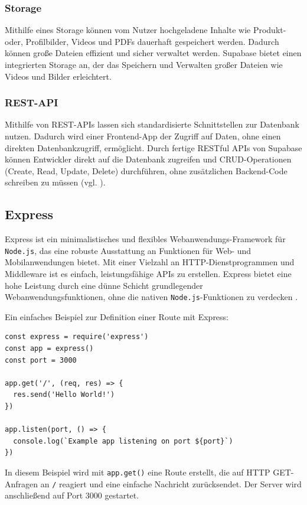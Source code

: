 \documentclass[oneside]{ausarbeitung}
\begin{document}
\subsubsection{Storage}
Mithilfe eines Storage können vom Nutzer hochgeladene Inhalte wie Produkt- oder, Profilbilder, Videos und PDFs dauerhaft gespeichert werden. Dadurch können große Dateien effizient und sicher verwaltet werden. 
Supabase bietet einen integrierten Storage an, der das Speichern und Verwalten großer Dateien wie Videos und Bilder erleichtert. 
\subsubsection{REST-API}
Mithilfe von REST-APIs lassen sich standardisierte Schnittstellen zur Datenbank nutzen. Dadurch wird einer Frontend-App der Zugriff auf Daten, ohne einen direkten Datenbankzugriff, ermöglicht. 
Durch fertige RESTful APIs von Supabase können Entwickler direkt auf die Datenbank zugreifen und CRUD-Operationen (Create, Read, Update, Delete) durchführen, ohne zusätzlichen Backend-Code schreiben zu müssen (vgl. \parencite{supabase}). 
\subsection{Express}

Express ist ein minimalistisches und flexibles Webanwendungs-Framework für \texttt{Node.js}, das eine robuste Ausstattung an Funktionen für Web- und Mobilanwendungen bietet. Mit einer Vielzahl an HTTP-Dienstprogrammen und Middleware ist es einfach, leistungsfähige APIs zu erstellen. Express bietet eine hohe Leistung durch eine dünne Schicht grundlegender Webanwendungsfunktionen, ohne die nativen \texttt{Node.js}-Funktionen zu verdecken \parencite{express-official}.  

Ein einfaches Beispiel zur Definition einer Route mit Express:  

\begin{verbatim}
const express = require('express')
const app = express()
const port = 3000

app.get('/', (req, res) => {
  res.send('Hello World!')
})

app.listen(port, () => {
  console.log(`Example app listening on port ${port}`)
})
\end{verbatim}

In diesem Beispiel wird mit \texttt{app.get()} eine Route erstellt, die auf HTTP GET-Anfragen an \texttt{/} reagiert und eine einfache Nachricht zurücksendet. Der Server wird anschließend auf Port 3000 gestartet.  
\end{document}
